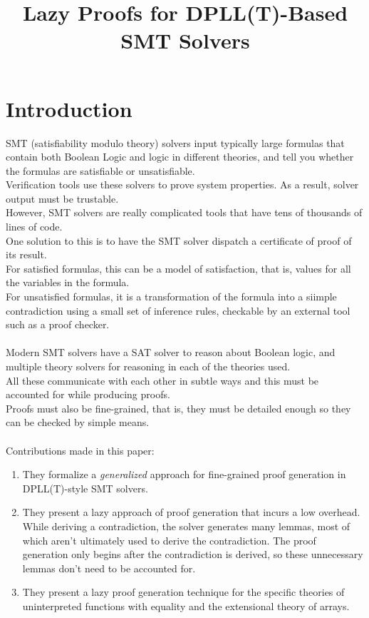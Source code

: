\documentclass{article}
\begin{document}
\title{Lazy Proofs for DPLL(T)-Based SMT Solvers}
\date{}
\maketitle
\section{Introduction}
SMT (satisfiability modulo theory) solvers input typically large 
formulas that contain both Boolean Logic and logic in different 
theories, and tell you whether the formulas are satisfiable or 
unsatisfiable. \\
Verification tools use these solvers to prove system properties. 
As a result, solver output must be trustable. \\
However, SMT solvers are really complicated tools that have tens 
of thousands of lines of code. \\
One solution to this is to have the SMT solver dispatch a 
certificate of proof of its result. \\
For satisfied formulas, this can be a model of satisfaction, 
that is, values for all the variables in the formula. \\
For unsatisfied formulas, it is a transformation of the formula
into a siimple contradiction using a small set of inference rules, 
checkable by an external tool such as a proof checker. \\
\\
Modern SMT solvers have a SAT solver to reason about Boolean 
logic, and multiple theory solvers for reasoning in each of the 
theories used. \\
All these communicate with each other in subtle ways and 
this must be accounted for while producing proofs. \\
Proofs must also be fine-grained, that is, they must be 
detailed enough so they can be checked by simple means. \\
\\
Contributions made in this paper:
\begin{enumerate}
	\item They formalize a \textit{generalized} approach
	for fine-grained proof generation in DPLL(T)-style
	SMT solvers.
	\item They present a lazy approach of proof generation
	that incurs a low overhead. While deriving a contradiction,
	the solver generates many lemmas, most of which aren't 
	ultimately used to derive the contradiction.
	The proof generation only begins after the contradiction
	is derived, so these unnecessary lemmas don't need to be
	accounted for.
	\item They present a lazy proof generation technique for
	the specific theories of uninterpreted functions with
	equality and the extensional theory of arrays.
\end{enumerate}
\end{document}
